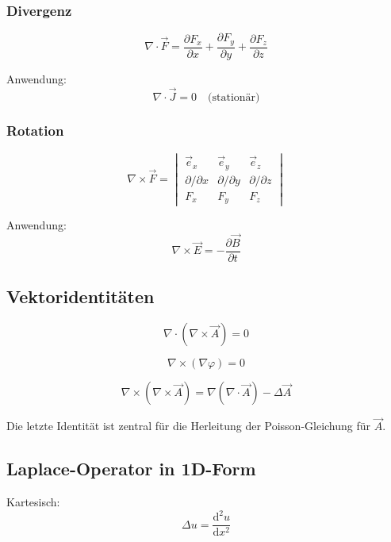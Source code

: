 \documentclass[a4paper]{article}
\renewcommand{\dd}{\mathrm{d}}
\newcommand{\E}{\vec E}
\newcommand{\B}{\vec B}
\newcommand{\J}{\vec J}
\newcommand{\A}{\vec A}
\begin{document}
\subsubsection{Divergenz}

\[
\nabla\cdot\vec F =
\frac{\partial F_x}{\partial x}
+\frac{\partial F_y}{\partial y}
+\frac{\partial F_z}{\partial z}
\]

Anwendung:
\[
\nabla\cdot\J=0
\quad\text{(stationär)}
\]

\subsubsection{Rotation}

\[
\nabla\times\vec F =
\begin{vmatrix}
\vec e_x & \vec e_y & \vec e_z \\
\partial/\partial x & \partial/\partial y & \partial/\partial z \\
F_x & F_y & F_z
\end{vmatrix}
\]

Anwendung:
\[
\nabla\times\E=-\frac{\partial\B}{\partial t}
\]

\subsection{Vektoridentitäten }

\[
\nabla\cdot(\nabla\times\vec A)=0
\]

\[
\nabla\times(\nabla\varphi)=0
\]

\[
\nabla\times(\nabla\times\vec A)
=\nabla(\nabla\cdot\vec A)-\Delta\vec A
\]

\begin{checkitem}
Die letzte Identität ist zentral für die Herleitung der Poisson-Gleichung für $\A$.
\end{checkitem}

\subsection{Laplace-Operator in 1D-Form}

Kartesisch:
\[
\Delta u=\frac{\dd^2 u}{\dd x^2}
\]
\end{document}

